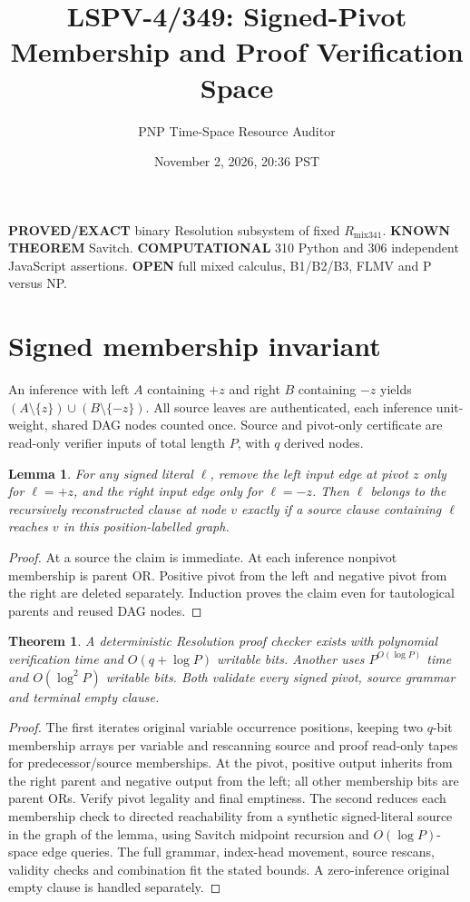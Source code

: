 \documentclass[11pt]{article}
\title{LSPV-4/349: Signed-Pivot Membership and Proof Verification Space}
\author{PNP Time-Space Resource Auditor}\date{November 2, 2026, 20:36 PST}
\newtheorem{lemma}{Lemma}\newtheorem{theorem}{Theorem}
\begin{document}
\maketitle
\noindent\textbf{PROVED/EXACT} binary Resolution subsystem of fixed $R_{\mathrm{mix341}}$. \textbf{KNOWN THEOREM} Savitch. \textbf{COMPUTATIONAL} 310 Python and 306 independent JavaScript assertions. \textbf{OPEN} full mixed calculus, B1/B2/B3, FLMV and P versus NP.
\section*{Signed membership invariant}
An inference with left $A$ containing $+z$ and right $B$ containing $-z$ yields $(A\setminus\{z\})\cup(B\setminus\{-z\})$. All source leaves are authenticated, each inference unit-weight, shared DAG nodes counted once. Source and pivot-only certificate are read-only verifier inputs of total length $P$, with $q$ derived nodes.
\begin{lemma}
For any signed literal $\ell$, remove the left input edge at pivot $z$ only for $\ell=+z$, and the right input edge only for $\ell=-z$. Then $\ell$ belongs to the recursively reconstructed clause at node $v$ exactly if a source clause containing $\ell$ reaches $v$ in this position-labelled graph.
\end{lemma}
\begin{proof}At a source the claim is immediate. At each inference nonpivot membership is parent OR. Positive pivot from the left and negative pivot from the right are deleted separately. Induction proves the claim even for tautological parents and reused DAG nodes.\end{proof}
\begin{theorem}
A deterministic Resolution proof checker exists with polynomial verification time and $O(q+\log P)$ writable bits. Another uses $P^{O(\log P)}$ time and $O(\log^2 P)$ writable bits. Both validate every signed pivot, source grammar and terminal empty clause.
\end{theorem}
\begin{proof}
The first iterates original variable occurrence positions, keeping two $q$-bit membership arrays per variable and rescanning source and proof read-only tapes for predecessor/source memberships. At the pivot, positive output inherits from the right parent and negative output from the left; all other membership bits are parent ORs. Verify pivot legality and final emptiness. The second reduces each membership check to directed reachability from a synthetic signed-literal source in the graph of the lemma, using Savitch midpoint recursion and $O(\log P)$-space edge queries. The full grammar, index-head movement, source rescans, validity checks and combination fit the stated bounds. A zero-inference original empty clause is handled separately.\end{proof}
\end{document}
